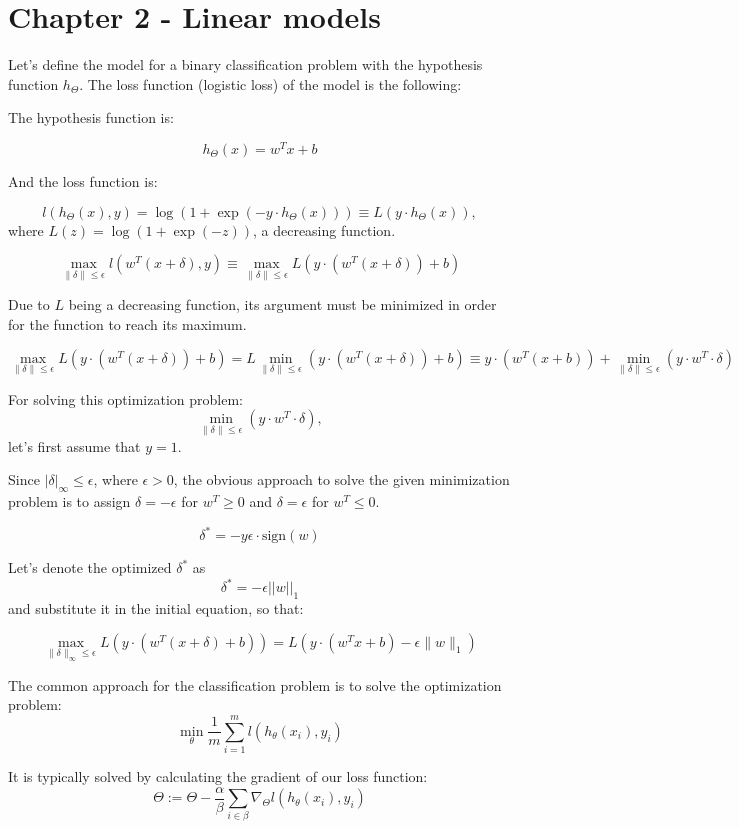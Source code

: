 \section{Chapter 2 - Linear models}

Let's define the model for a binary classification problem with the hypothesis function $h_\Theta$.  The loss function (logistic loss) of the model is the following:

The hypothesis function is:

\[h_\Theta(x) = w^T x + b\]

And the loss function is:

\[ l(h_\Theta(x), y) = \log(1 + \exp(-y \cdot h_\Theta(x))) \equiv L(y \cdot h_\Theta(x)), \]
where $L(z)=\log(1+\exp(-z))$, a decreasing function.

\[\max_{\|\delta\| \leq \epsilon} l(w^T (x+\delta), y) \equiv \max_{\|\delta\| \leq \epsilon} L(y \cdot (w^T(x+\delta)) + b)\]

Due to $L$ being a decreasing function, its argument must be minimized in order for the function to reach its maximum. 

\[ \max_{\|\delta\| \leq \epsilon} L(y \cdot (w^T(x+\delta)) + b) = L \min_{\|\delta\| \leq \epsilon}(y \cdot (w^T(x+\delta)) + b) \equiv y \cdot (w^T(x + b)) + \min_{\|\delta\| \leq \epsilon}(y \cdot w^T \cdot \delta)\]

For solving this optimization problem: \[\min_{\|\delta\| \leq \epsilon}(y \cdot w^T \cdot \delta),\] let's first assume
that $y=1$. 

Since $ | \delta |_{\infty} \leq \epsilon $, where $\epsilon > 0$, the obvious approach to solve the given minimization problem is to assign $\delta = -\epsilon$ for $w^T \geq 0$ and $\delta = \epsilon$ for $w^T \leq 0$.

\[\delta^*=-y\epsilon \cdot \text{sign}(w)\]

Let's denote the optimized $\delta^*$ as \[\delta^* = -\epsilon ||w||_1\]
and substitute it in the initial equation, so that:

\[\max_{\|\delta\|_{\infty} \leq \epsilon} L(y \cdot (w^T(x+\delta)+b)) = L(y \cdot (w^Tx+b) - \epsilon \|w\|_1)\]

The common approach for the classification problem is to solve the optimization problem:
\[\min_{\theta} \frac{1}{m} \sum_{i=1}^{m} l(h_{\theta}(x_{i}), y_{i})\]

It is typically solved by calculating the gradient of our loss function:
\[ \Theta := \Theta - \dfrac{\alpha}{\beta} \sum_{i \in \beta} \nabla_\Theta l (h_{\theta}(x_{i}), y_{i}) \]

